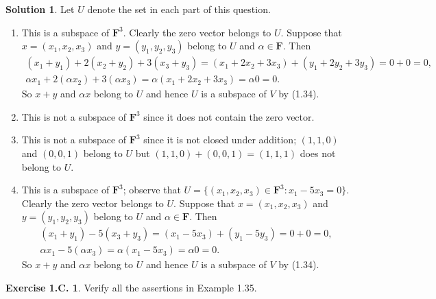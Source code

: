 \documentclass[12pt]{article}
\theoremstyle{definition}
\theoremstyle{exercise}
\newtheorem{exercise}{Exercise 1.C.}
\theoremstyle{solution}
\newtheorem*{solution}{Solution}
\newcommand{\F}{\mathbf{F}}
\begin{document}
\begin{solution}
    Let \( U \) denote the set in each part of this question.
    \begin{enumerate}
        \item This is a subspace of \( \F^3 \). Clearly the zero vector belongs to \( U \). Suppose that \( x = (x_1, x_2, x_3) \) and \( y = (y_1, y_2, y_3) \) belong to \( U \) and \( \alpha \in \F \). Then
        \begin{gather*}
            (x_1 + y_1) + 2(x_2 + y_2) + 3(x_3 + y_3) = (x_1 + 2 x_2 + 3 x_3) + (y_1 + 2 y_2 + 3 y_3) = 0 + 0 = 0, \\[2mm]
            \alpha x_1 + 2 (\alpha x_2) + 3 (\alpha x_3) = \alpha (x_1 + 2 x_2 + 3 x_3) = \alpha 0 = 0.
        \end{gather*}
        So \( x + y \) and \( \alpha x \) belong to \( U \) and hence \( U \) is a subspace of \( V \) by (1.34).

        \item This is not a subspace of \( \F^3 \) since it does not contain the zero vector.

        \item This is not a subspace of \( \F^3 \) since it is not closed under addition; \( (1, 1, 0) \) and \( (0, 0, 1) \) belong to \( U \) but \( (1, 1, 0) + (0, 0, 1) = (1, 1, 1) \) does not belong to \( U \).

        \item This is a subspace of \( \F^3 \); observe that \( U = \{ (x_1, x_2, x_3) \in \F^3 : x_1 - 5 x_3 = 0 \} \). Clearly the zero vector belongs to \( U \). Suppose that \( x = (x_1, x_2, x_3) \) and \( y = (y_1, y_2, y_3) \) belong to \( U \) and \( \alpha \in \F \). Then
        \begin{gather*}
            (x_1 + y_1) - 5(x_3 + y_3) = (x_1 - 5 x_3) + (y_1 - 5 y_3) = 0 + 0 = 0, \\[2mm]
            \alpha x_1 - 5 (\alpha x_3) = \alpha (x_1 - 5 x_3) = \alpha 0 = 0.
        \end{gather*}
        So \( x + y \) and \( \alpha x \) belong to \( U \) and hence \( U \) is a subspace of \( V \) by (1.34).
    \end{enumerate}
\end{solution}

\begin{exercise}
\label{ex:2}
    Verify all the assertions in Example 1.35.
\end{exercise}
\end{document}
